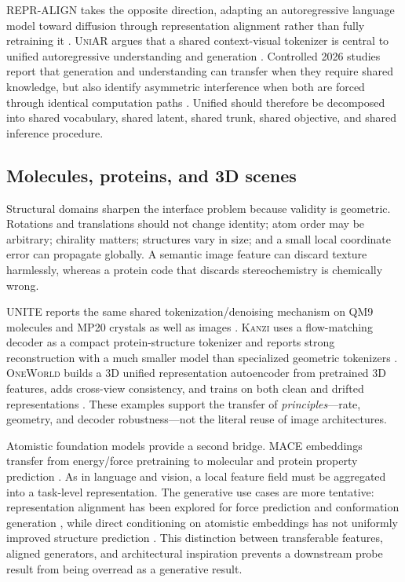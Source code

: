 \documentclass{article}
\newcommand{\method}[1]{\textsc{#1}}
\begin{document}
\method{REPR-ALIGN} takes the opposite direction, adapting an autoregressive language model toward diffusion through representation alignment rather than fully retraining it \citep{peng2026repralign}. \method{UniAR} argues that a shared context-visual tokenizer is central to unified autoregressive understanding and generation \citep{peng2026uniar}. Controlled 2026 studies report that generation and understanding can transfer when they require shared knowledge, but also identify asymmetric interference when both are forced through identical computation paths \citep{zhu2026vgaudiag,wu2026synergy}. Unified should therefore be decomposed into shared vocabulary, shared latent, shared trunk, shared objective, and shared inference procedure.

\subsection{Molecules, proteins, and 3D scenes}

Structural domains sharpen the interface problem because validity is geometric. Rotations and translations should not change identity; atom order may be arbitrary; chirality matters; structures vary in size; and a small local coordinate error can propagate globally. A semantic image feature can discard texture harmlessly, whereas a protein code that discards stereochemistry is chemically wrong.

\method{UNITE} reports the same shared tokenization/denoising mechanism on QM9 molecules and MP20 crystals as well as images \citep{duggal2026unite}. \method{Kanzi} uses a flow-matching decoder as a compact protein-structure tokenizer and reports strong reconstruction with a much smaller model than specialized geometric tokenizers \citep{dilip2026kanzi}. \method{OneWorld} builds a 3D unified representation autoencoder from pretrained 3D features, adds cross-view consistency, and trains on both clean and drifted representations \citep{gao2026oneworld}. These examples support the transfer of \emph{principles}---rate, geometry, and decoder robustness---not the literal reuse of image architectures.

Atomistic foundation models provide a second bridge. MACE embeddings transfer from energy/force pretraining to molecular and protein property prediction \citep{batatia2025mace,wedig2025rem3di,bojan2025protein}. As in language and vision, a local feature field must be aggregated into a task-level representation. The generative use cases are more tentative: representation alignment has been explored for force prediction and conformation generation \citep{pinede2025macerepa}, while direct conditioning on atomistic embeddings has not uniformly improved structure prediction \citep{corley2025atomworks}. This distinction between transferable features, aligned generators, and architectural inspiration prevents a downstream probe result from being overread as a generative result.
\end{document}
